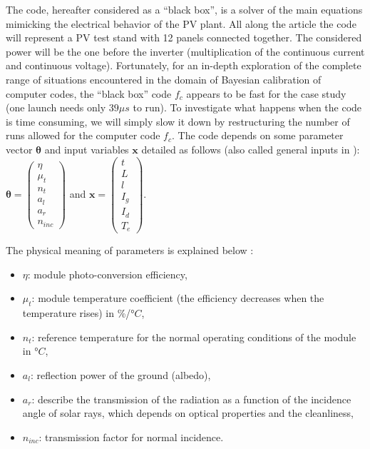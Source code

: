 \documentclass[soumission]{jsfds}
\edef\hc{\string: }
\begin{document}
The code, hereafter considered as a ``black box'', is a solver of the main equations mimicking the electrical behavior of the PV plant. All along the article the code will represent a PV test stand with 12 panels connected together. The considered power will be the one before the inverter (multiplication of the continuous current and continuous voltage). Fortunately, for an in-depth exploration of the complete range of situations encountered in the domain of Bayesian calibration of computer codes, the ``black box'' code $f_c$ appears to be fast for the case study (one launch needs only $39\mu s$ to run). To investigate what happens when the code is time consuming, we will simply slow it down by restructuring the number of runs allowed for the computer code $f_c$.
The code depends on some parameter vector $\boldsymbol{\theta}$ and input variables $\boldsymbol{x}$ detailed as follows (also called general inputs in \citet{plumlee2017}): $\boldsymbol{\theta}=\begin{pmatrix}
\eta \\
\mu_t \\
n_t \\
a_l \\
a_r\\
n_{inc}
\end{pmatrix}$ and $\boldsymbol{x}=\begin{pmatrix}
t\\
L\\
l\\
I_g\\
I_d \\
T_e
\end{pmatrix}$. \newline

The physical meaning of parameters is explained below \citep{duffie2013}\hc 
\begin{itemize}
\item $\eta$\hc module photo-conversion efficiency,
\item $\mu_t$\hc module temperature coefficient (the efficiency decreases when the temperature rises) in \%/°$C$,
\item $n_t$\hc reference temperature for the normal operating conditions of the module in °$C$,
\item $a_l$\hc reflection power of the ground (albedo),
\item $a_r$\hc describe the transmission of the radiation as a function of the incidence angle of solar rays, which depends on optical properties and the cleanliness,
\item $n_{inc}$\hc transmission factor for normal incidence. \newline
\end{itemize}
\end{document}
